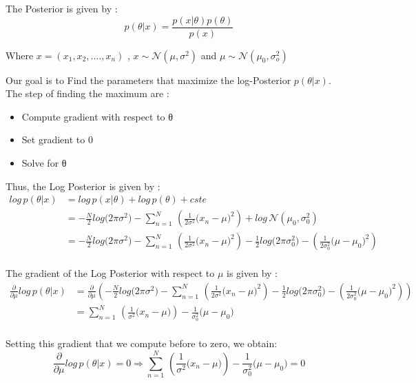 \documentclass[12pt,twoside]{article}
\begin{document}
The Posterior is given by :
\begin{equation*}
p(\theta|x) = \frac{p(x|\theta)p(\theta)}{p(x)}
\end{equation*}

Where $x =(x_1,x_2,....,x_n)$ , $x \sim \mathcal{N}(\mu, \sigma^2)$ and $\mu \sim \mathcal{N}(\mu_0, \sigma^2_o)$

Our goal is to Find the parameters that maximize the log-Posterior $p(\theta|x)$.\\
The step of finding the maximum are :
\begin{itemize}
	\item  Compute gradient with respect to θ
	\item  Set gradient to 0
	\item  Solve for θ
\end{itemize}

Thus, the Log Posterior is given by :
\begin{align*}
log \, p(\theta|x) &= log \, p(x|\theta) + log \, p(\theta) + cste \\
                   &= -\frac{N}{2} log\big(2 \pi \sigma^2\big) - \sum_{n=1}^{N}  \, \left( \frac{1}{2 \sigma^2}\big(x_n - \mu\big)^2 \right) + log \, \mathcal{N}(\mu_0, \sigma_0^2)\\
                   &= -\frac{N}{2} log\big(2 \pi \sigma^2\big) - \sum_{n=1}^{N}  \, \left( \frac{1}{2 \sigma^2}\big(x_n - \mu\big)^2 \right)  -\frac{1}{2} log\big(2 \pi \sigma_0^2\big) - \left( \frac{1}{2 \sigma_0^2}\big(\mu - \mu_0\big)^2 \right) \\
\end{align*}

The gradient of the Log Posterior with respect to $\mu$ is given by :
\begin{align*}
\frac{\partial}{\partial \mu}log \,p(\theta|x) &= \frac{\partial}{\partial \mu}  \left( -\frac{N}{2} log\big(2 \pi \sigma^2\big) - \sum_{n=1}^{N}  \, \left( \frac{1}{2 \sigma^2}\big(x_n - \mu\big)^2 \right)  -\frac{1}{2} log\big(2 \pi \sigma_0^2\big) - \left( \frac{1}{2 \sigma_0^2}\big(\mu - \mu_0\big)^2 \right) \right) \\
&= \sum_{n=1}^{N}  \, \left( \frac{1}{\sigma^2}\big(x_n - \mu\big) \right)  -\frac{1}{\sigma_0^2}\big(\mu - \mu_0\big) \\
\end{align*}

Setting this gradient that we compute before to zero, we obtain:
\begin{equation*}
\frac{\partial}{\partial \mu}log \,p(\theta|x) = 0 \Longrightarrow \sum_{n=1}^{N}  \, \left( \frac{1}{\sigma^2}\big(x_n - \mu\big) \right) -\frac{1}{\sigma_0^2}\big(\mu - \mu_0\big) = 0 
\end{equation*}
\end{document}
